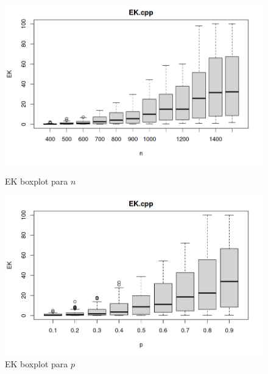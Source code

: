\documentclass{uofa-eng-assignment}
\begin{document}
\begin{figure}[h]
    \begin{minipage}{0.45\textwidth}
        \centering
        \includegraphics[width=1\textwidth]{boxplot_ek_n.png}
        \caption{EK boxplot para $n$}
        \label{fig:boxplot-ek-n}
    \end{minipage}
    \hfill
    \begin{minipage}{0.45\textwidth}
        \centering
        \includegraphics[width=1\textwidth]{boxplot_ek_p.png}
        \caption{EK boxplot para $p$}
        \label{fig:boxplot-ek-p}
    \end{minipage}
\end{figure}
\end{document}
